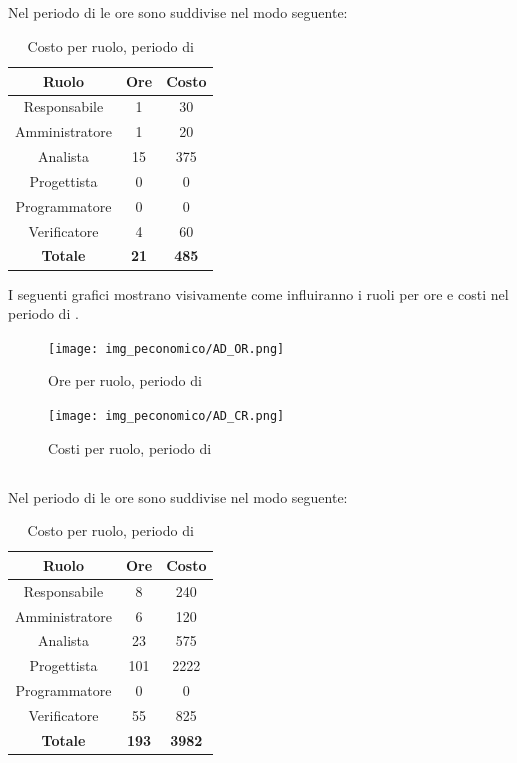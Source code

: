 \subsection{\AD}
Nel periodo di \AD{} le ore sono suddivise nel modo seguente:
\begin{table}[H]
	\centering
	\begin{tabular}{|c|c|c|}
		\hline
		\textbf{Ruolo} &
		\textbf{Ore} &
		\textbf{Costo} \\
		\hline
		Responsabile & 1 & 30\\
		\hline
		Amministratore & 1 & 20\\
		\hline
		Analista & 15 & 375\\
		\hline
		Progettista & 0 & 0 \\
		\hline
		Programmatore & 0 & 0 \\
		\hline
		Verificatore & 4 & 60\\
		\hline
		\textbf{Totale} & \textbf{21} & \textbf{485} \\
		\hline
	\end{tabular}
	\caption{Costo per ruolo, periodo di \AD}
\end{table}

I seguenti grafici mostrano visivamente come influiranno i ruoli per ore e costi nel periodo di \AD.
\begin{figure}[H]
	\centering
	\texttt{[image: img\_peconomico/AD\_OR.png]}
	\caption{Ore per ruolo, periodo di \AD}
\end{figure}
\begin{figure}[H]
	\centering
	\texttt{[image: img\_peconomico/AD\_CR.png]}
	\caption{Costi per ruolo, periodo di \AD}
\end{figure}

\subsection{\PA}
Nel periodo di \PA{} le ore sono suddivise nel modo seguente:
\begin{table}[H]
	\centering
	\begin{tabular}{|c|c|c|}
		\hline
		\textbf{Ruolo} &
		\textbf{Ore} &
		\textbf{Costo} \\
		\hline
		Responsabile & 8 & 240\\
		\hline
		Amministratore & 6 & 120\\
		\hline
		Analista & 23 & 575\\
		\hline
		Progettista & 101 & 2222 \\
		\hline
		Programmatore & 0 & 0 \\
		\hline
		Verificatore & 55 & 825\\
		\hline
		\textbf{Totale} & \textbf{193} & \textbf{3982} \\
		\hline
	\end{tabular}
	\caption{Costo per ruolo, periodo di \PA}
\end{table}

